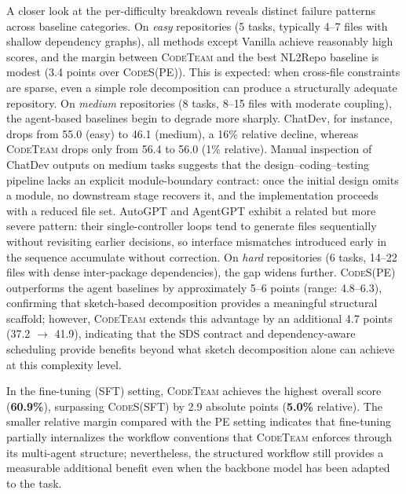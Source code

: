 \documentclass[format=acmsmall, review=false, screen=true]{acmart}
\newcommand{\tool}{\textsc{CodeTeam}\xspace}
\newcommand{\codes}{\textsc{CodeS}\xspace}
\begin{document}
A closer look at the per-difficulty breakdown reveals distinct failure patterns across baseline categories.
On \emph{easy} repositories (5 tasks, typically 4--7 files with shallow dependency graphs), all methods except Vanilla achieve reasonably high scores, and the margin between \tool and the best NL2Repo baseline is modest (3.4 points over \codes (PE)).
This is expected: when cross-file constraints are sparse, even a simple role decomposition can produce a structurally adequate repository.
On \emph{medium} repositories (8 tasks, 8--15 files with moderate coupling), the agent-based baselines begin to degrade more sharply.
ChatDev, for instance, drops from 55.0 (easy) to 46.1 (medium), a 16\% relative decline, whereas \tool drops only from 56.4 to 56.0 (1\% relative).
Manual inspection of ChatDev outputs on medium tasks suggests that the design--coding--testing pipeline lacks an explicit module-boundary contract: once the initial design omits a module, no downstream stage recovers it, and the implementation proceeds with a reduced file set.
AutoGPT and AgentGPT exhibit a related but more severe pattern: their single-controller loops tend to generate files sequentially without revisiting earlier decisions, so interface mismatches introduced early in the sequence accumulate without correction.
On \emph{hard} repositories (6 tasks, 14--22 files with dense inter-package dependencies), the gap widens further.
\codes (PE) outperforms the agent baselines by approximately 5--6 points (range: 4.8--6.3), confirming that sketch-based decomposition provides a meaningful structural scaffold; however, \tool extends this advantage by an additional 4.7 points (37.2 $\to$ 41.9), indicating that the SDS contract and dependency-aware scheduling provide benefits beyond what sketch decomposition alone can achieve at this complexity level.

In the fine-tuning (SFT) setting, \tool achieves the highest overall score (\textbf{60.9\%}), surpassing \codes (SFT) by 2.9 absolute points (\textbf{5.0\%} relative).
The smaller relative margin compared with the PE setting indicates that fine-tuning partially internalizes the workflow conventions that \tool enforces through its multi-agent structure; nevertheless, the structured workflow still provides a measurable additional benefit even when the backbone model has been adapted to the task.
\end{document}
